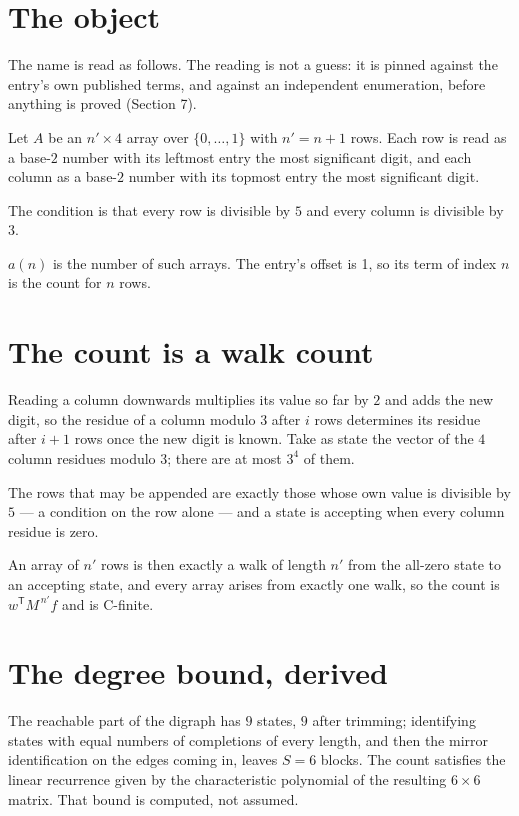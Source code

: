 \documentclass[11pt]{article}
\theoremstyle{definition}
\begin{document}
\section{The object}

The name is read as follows. The reading is not a guess: it is pinned against the entry's own published terms, and against an independent enumeration, before anything is proved (Section 7).

Let $A$ be an $n' \times 4$ array over $\{0,\dots,1\}$ with $n' = n + 1$ rows. Each row is read as a base-$2$ number with its leftmost entry the most significant digit, and each column as a base-$2$ number with its topmost entry the most significant digit.

The condition is that every row is divisible by $5$ and every column is divisible by $3$.

$a(n)$ is the number of such arrays. The entry's offset is 1, so its term of index $n$ is the count for $n$ rows.

\section{The count is a walk count}

Reading a column downwards multiplies its value so far by $2$ and adds the new digit, so the residue of a column modulo $3$ after $i$ rows determines its residue after $i+1$ rows once the new digit is known. Take as state the vector of the $4$ column residues modulo $3$; there are at most $3^{4}$ of them.

The rows that may be appended are exactly those whose own value is divisible by $5$ --- a condition on the row alone --- and a state is accepting when every column residue is zero.

An array of $n'$ rows is then exactly a walk of length $n'$ from the all-zero state to an accepting state, and every array arises from exactly one walk, so the count is $w^{\mathsf T}M^{\,n'}f$ and is C-finite.

\section{The degree bound, derived}

The reachable part of the digraph has $9$ states, $9$ after trimming; identifying states with equal numbers of completions of every length, and then the mirror identification on the edges coming in, leaves $S = 6$ blocks. The count satisfies the linear recurrence given by the characteristic polynomial of the resulting $6\times6$ matrix. That bound is computed, not assumed.
\end{document}

